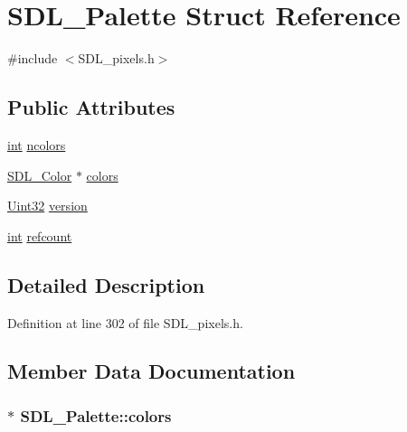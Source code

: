 \hypertarget{struct_s_d_l___palette}{\section{S\-D\-L\-\_\-\-Palette Struct Reference}
\label{struct_s_d_l___palette}
}


{\ttfamily \#include $<$S\-D\-L\-\_\-pixels.\-h$>$}

\subsection*{Public Attributes}
\begin{DoxyCompactItemize}
\item 
\hyperlink{_s_d_l__thread_8h_a6a64f9be4433e4de6e2f2f548cf3c08e}{int} \hyperlink{struct_s_d_l___palette_a81a0cc3197480e994c6b06f1f0567091}{ncolors}
\item 
\hyperlink{struct_s_d_l___color}{S\-D\-L\-\_\-\-Color} $\ast$ \hyperlink{struct_s_d_l___palette_ad757a50037f43533196e94942440b241}{colors}
\item 
\hyperlink{_s_d_l__stdinc_8h_add440eff171ea5f55cb00c4a9ab8672d}{Uint32} \hyperlink{struct_s_d_l___palette_a5b8d45519f6850a32f13f1602ce37a8e}{version}
\item 
\hyperlink{_s_d_l__thread_8h_a6a64f9be4433e4de6e2f2f548cf3c08e}{int} \hyperlink{struct_s_d_l___palette_a35c667737f883f973bb0a8dea143b08d}{refcount}
\end{DoxyCompactItemize}


\subsection{Detailed Description}


Definition at line 302 of file S\-D\-L\-\_\-pixels.\-h.



\subsection{Member Data Documentation}
\hypertarget{struct_s_d_l___palette_ad757a50037f43533196e94942440b241}{
\subsubsection[{colors}]{$\ast$ S\-D\-L\-\_\-\-Palette\-::colors}}\label{struct_s_d_l___palette_ad757a50037f43533196e94942440b241}


